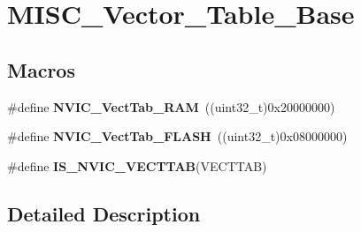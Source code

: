 \hypertarget{group___m_i_s_c___vector___table___base}{\section{M\-I\-S\-C\-\_\-\-Vector\-\_\-\-Table\-\_\-\-Base}
\label{group___m_i_s_c___vector___table___base}
}
\subsection*{Macros}
\begin{DoxyCompactItemize}
\item 
\hypertarget{group___m_i_s_c___vector___table___base_ga8be8181cc3e5d42f6204af306ab50f80}{\#define {\bfseries N\-V\-I\-C\-\_\-\-Vect\-Tab\-\_\-\-R\-A\-M}~((uint32\-\_\-t)0x20000000)}\label{group___m_i_s_c___vector___table___base_ga8be8181cc3e5d42f6204af306ab50f80}

\item 
\hypertarget{group___m_i_s_c___vector___table___base_gafbf92fd28a1090b2aa49732ebd5704b5}{\#define {\bfseries N\-V\-I\-C\-\_\-\-Vect\-Tab\-\_\-\-F\-L\-A\-S\-H}~((uint32\-\_\-t)0x08000000)}\label{group___m_i_s_c___vector___table___base_gafbf92fd28a1090b2aa49732ebd5704b5}

\item 
\#define {\bfseries I\-S\-\_\-\-N\-V\-I\-C\-\_\-\-V\-E\-C\-T\-T\-A\-B}(V\-E\-C\-T\-T\-A\-B)
\end{DoxyCompactItemize}


\subsection{Detailed Description}


